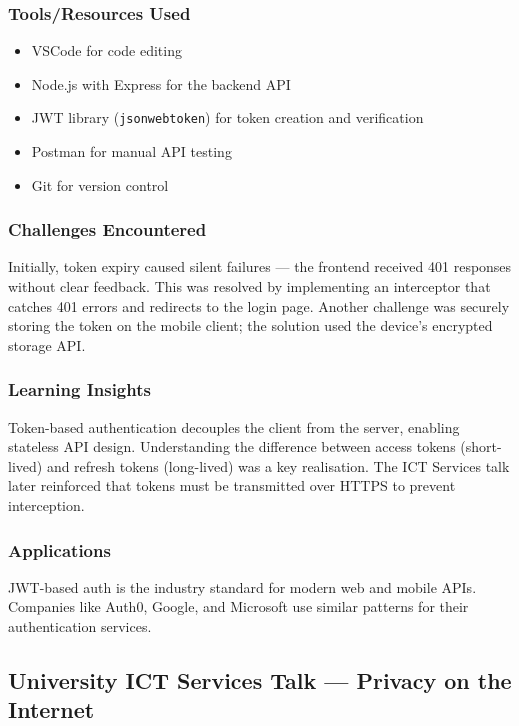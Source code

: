 \documentclass[12pt,a4paper]{article}
\begin{document}
\subsubsection*{Tools/Resources Used}
\begin{itemize}
    \item VSCode for code editing
    \item Node.js with Express for the backend API
    \item JWT library (\texttt{jsonwebtoken}) for token creation and verification
    \item Postman for manual API testing
    \item Git for version control
\end{itemize}

\subsubsection*{Challenges Encountered}
Initially, token expiry caused silent failures --- the frontend received 401 responses without clear feedback. This was resolved by implementing an interceptor that catches 401 errors and redirects to the login page. Another challenge was securely storing the token on the mobile client; the solution used the device's encrypted storage API.

\subsubsection*{Learning Insights}
Token-based authentication decouples the client from the server, enabling stateless API design. Understanding the difference between access tokens (short-lived) and refresh tokens (long-lived) was a key realisation. The ICT Services talk later reinforced that tokens must be transmitted over HTTPS to prevent interception.

\subsubsection*{Applications}
JWT-based auth is the industry standard for modern web and mobile APIs. Companies like Auth0, Google, and Microsoft use similar patterns for their authentication services.

\subsection{University ICT Services Talk --- Privacy on the Internet}
\label{subsec:ict_talk}
\end{document}
